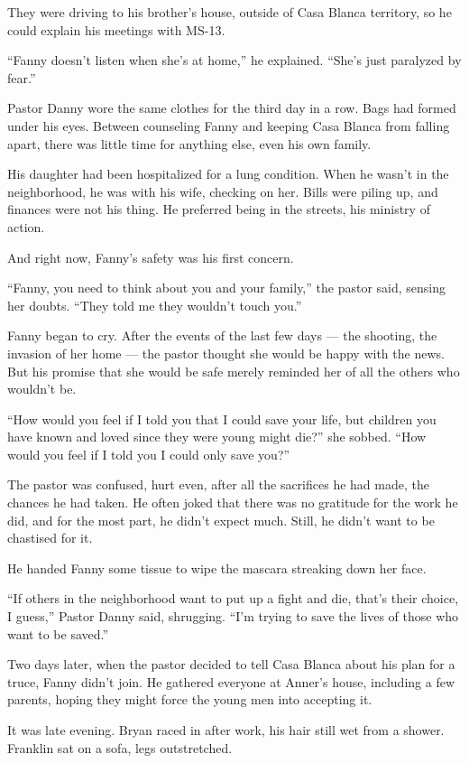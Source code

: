 They were driving to his brother's house, outside of Casa Blanca
territory, so he could explain his meetings with MS-13.

``Fanny doesn't listen when she's at home,'' he explained. ``She's just
paralyzed by fear.''

Pastor Danny wore the same clothes for the third day in a row. Bags had
formed under his eyes. Between counseling Fanny and keeping Casa Blanca
from falling apart, there was little time for anything else, even his
own family.

His daughter had been hospitalized for a lung condition. When he wasn't
in the neighborhood, he was with his wife, checking on her. Bills were
piling up, and finances were not his thing. He preferred being in the
streets, his ministry of action.

And right now, Fanny's safety was his first concern.

``Fanny, you need to think about you and your family,'' the pastor said,
sensing her doubts. ``They told me they wouldn't touch you.''

Fanny began to cry. After the events of the last few days --- the
shooting, the invasion of her home --- the pastor thought she would be
happy with the news. But his promise that she would be safe merely
reminded her of all the others who wouldn't be.

``How would you feel if I told you that I could save your life, but
children you have known and loved since they were young might die?'' she
sobbed. ``How would you feel if I told you I could only save you?''

The pastor was confused, hurt even, after all the sacrifices he had
made, the chances he had taken. He often joked that there was no
gratitude for the work he did, and for the most part, he didn't expect
much. Still, he didn't want to be chastised for it.

He handed Fanny some tissue to wipe the mascara streaking down her face.

``If others in the neighborhood want to put up a fight and die, that's
their choice, I guess,'' Pastor Danny said, shrugging. ``I'm trying to
save the lives of those who want to be saved.''

Two days later, when the pastor decided to tell Casa Blanca about his
plan for a truce, Fanny didn't join. He gathered everyone at Anner's
house, including a few parents, hoping they might force the young men
into accepting it.

It was late evening. Bryan raced in after work, his hair still wet from
a shower. Franklin sat on a sofa, legs outstretched.

